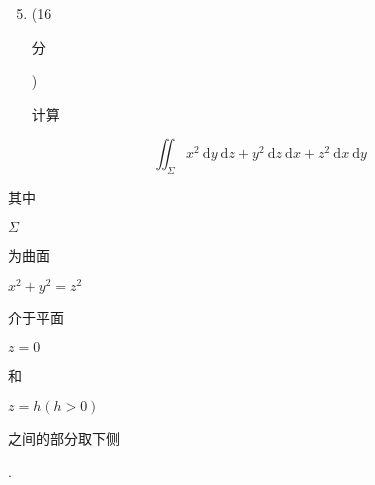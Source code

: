 \documentclass[10pt]{article}
\begin{document}
\begin{enumerate}
  \setcounter{enumi}{4}
  \item (16 \begin{CJK}{UTF8}{mj}分\end{CJK}) \begin{CJK}{UTF8}{mj}计算\end{CJK}
\end{enumerate}
$$
\iint_{\Sigma} x^{2} \mathrm{~d} y \mathrm{~d} z+y^{2} \mathrm{~d} z \mathrm{~d} x+z^{2} \mathrm{~d} x \mathrm{~d} y
$$
\begin{CJK}{UTF8}{mj}其中\end{CJK} $\Sigma$ \begin{CJK}{UTF8}{mj}为曲面\end{CJK} $x^{2}+y^{2}=z^{2}$ \begin{CJK}{UTF8}{mj}介于平面\end{CJK} $z=0$ \begin{CJK}{UTF8}{mj}和\end{CJK} $z=h(h>0)$ \begin{CJK}{UTF8}{mj}之间的部分取下侧\end{CJK}.
\end{document}
